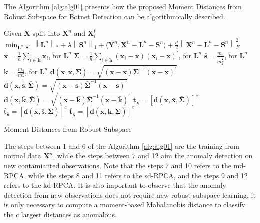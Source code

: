 \documentclass[review]{elsarticle}
\begin{document}
The Algorithm \ref{alg:alg01} presents how the proposed Moment Distances from Robust Subspace for Botnet Detection can be algorithmically described.
\begin{algorithm}
	\label{alg:alg01}
	\SetAlgoLined
	Given $\boldsymbol{X}$ split into $\boldsymbol{X}^n$ and $\boldsymbol{X}_i^t$\;
	$\min_{\boldsymbol{L}^n, \boldsymbol{S}^n}\left\|\boldsymbol{L}^n\right\|_* + \lambda\left\|\boldsymbol{S}^n\right\|_1 + \langle \boldsymbol{Y}^n, \boldsymbol{X}^n - \boldsymbol{L}^n - \boldsymbol{S}^n  \rangle + \frac{\mu}{2}\left\|\boldsymbol{X}^n - \boldsymbol{L}^n - \boldsymbol{S}^n\right\|_F^2$\;
	$\bar{\boldsymbol{x}} = \displaystyle\frac{1}{h}\displaystyle\sum_{i\in \boldsymbol{h}} \boldsymbol{x}_i$, for $\boldsymbol{L}^n$\;
	$\boldsymbol{\bar{\Sigma}} = \displaystyle\frac{1}{h}\displaystyle\sum_{i\in \boldsymbol{h}} (\boldsymbol{x}_i - \bar{\boldsymbol{x}})(\boldsymbol{x}_i - \bar{\boldsymbol{x}})^\prime$, for $\boldsymbol{L}^n$\;
	$\boldsymbol{\bar{s}} = \frac{m_3}{m_2^{\frac{3}{2}}}$, for $\boldsymbol{L}^n$\;
	$\boldsymbol{\bar{k}} = \frac{m_4}{m_2^2}$, for $\boldsymbol{L}^n$\;
	$\boldsymbol{d}(\boldsymbol{x}, \bar{\boldsymbol{x}}, \boldsymbol{\bar{\Sigma}}) = \sqrt{(\boldsymbol{x} - \bar{\boldsymbol{x}}) \boldsymbol{\bar{\Sigma}}^{-1}(\boldsymbol{x} - \bar{\boldsymbol{x}})^\prime}$\;
	$\boldsymbol{d}(\boldsymbol{x}, \bar{\boldsymbol{s}}, \boldsymbol{\bar{\Sigma}}) = \sqrt{(\boldsymbol{x} - \bar{\boldsymbol{s}}) \boldsymbol{\bar{\Sigma}}^{-1}(\boldsymbol{x} - \bar{\boldsymbol{s}})^\prime}$\;
	$\boldsymbol{d}(\boldsymbol{x}, \bar{\boldsymbol{k}}, \boldsymbol{\bar{\Sigma}}) = \sqrt{(\boldsymbol{x} - \bar{\boldsymbol{k}}) \boldsymbol{\bar{\Sigma}}^{-1}(\boldsymbol{x} - \bar{\boldsymbol{k}})^\prime}$\;
	$\boldsymbol{\bar{t}}_{\bar{\boldsymbol{x}}} = [\boldsymbol{d}(\boldsymbol{x}, \bar{\boldsymbol{x}}, \boldsymbol{\bar{\Sigma}})]^c$\;
	$\boldsymbol{\bar{t}}_{\bar{\boldsymbol{s}}} = [\boldsymbol{d}(\boldsymbol{x}, \bar{\boldsymbol{s}}, \boldsymbol{\bar{\Sigma}})]^c$\;
	$\boldsymbol{\bar{t}}_{\bar{\boldsymbol{k}}} = [\boldsymbol{d}(\boldsymbol{x}, \bar{\boldsymbol{k}}, \boldsymbol{\bar{\Sigma}})]^c$\;
	\caption{Moment Distances from Robust Subspace}
\end{algorithm}

The steps between 1 and 6 of the Algorithm \ref{alg:alg01} are the training from normal data $\boldsymbol{X}^n$, while the steps between 7 and 12 aim the anomaly detection on new contamianted observations. Note that the steps 7 and 10 refers to the md-RPCA, while the steps 8 and 11 refers to the sd-RPCA, and the steps 9 and 12 refers to the kd-RPCA. It is also important to observe that the anomaly detection from new observations does not require new robust subspace learning, it is only necessary to compute a moment-based Mahalanobis distance to classify the $c$ largest distances as anomalous.
\end{document}

